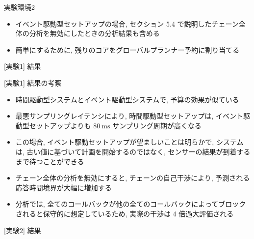 \begin{frame}{実験環境2}
    \begin{itemize}
        \item イベント駆動型セットアップの場合, セクション 5.4 で説明したチェーン全体の分析を無効にしたときの分析結果も含める
        \item 簡単にするために, 残りのコアをグローバルプランナー予約に割り当てる
    \end{itemize}
\end{frame}

\begin{frame}{[実験1] 結果}
\end{frame}

\begin{frame}{[実験1] 結果の考察}
    \begin{itemize}
        \item 時間駆動型システムとイベント駆動型システムで, 予算の効果が似ている
        \item 最悪サンプリングレイテンシにより, 時間駆動型セットアップは, イベント駆動型セットアップよりも $80 \mathrm{~ms}$ サンプリング周期が高くなる
        \item この場合, イベント駆動セットアップが望ましいことは明らかで, システムは, 古い値に基づいて計画を開始するのではなく, センサーの結果が到着するまで待つことができる
        \item チェーン全体の分析を無効にすると, チェーンの自己干渉により, 予測される応答時間境界が大幅に増加する
        \item 分析では, 全てのコールバックが他の全てのコールバックによってブロックされると保守的に想定しているため, 実際の干渉は 4 倍過大評価される
    \end{itemize}
\end{frame}

\begin{frame}{[実験2] 結果}
\end{frame}

